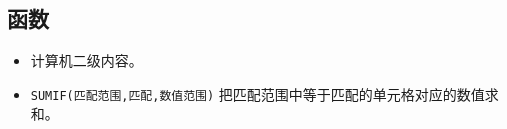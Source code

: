 
\begin{issues}
\issueDraft
\end{issues}

\subsection{函数}
\begin{itemize}
\item 计算机二级内容。
\item \verb|SUMIF(匹配范围,匹配,数值范围)| 把匹配范围中等于匹配的单元格对应的数值求和。
\end{itemize}
